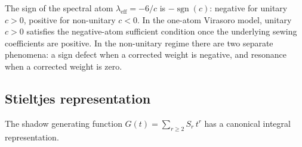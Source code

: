 \begin{remark}%
\label{rem:shadow-metric-gram}%
The sign of the spectral atom $\lambda_{\mathrm{eff}} = -6/c$
is $-\operatorname{sgn}(c)$: negative for unitary $c > 0$,
positive for non-unitary $c < 0$. In the one-atom Virasoro model,
unitary $c>0$ satisfies the negative-atom sufficient condition once the
underlying sewing coefficients are positive. In the non-unitary regime
there are two separate phenomena: a sign defect when a corrected weight
is negative, and resonance when a corrected weight is zero.
\end{remark}

\subsection{Stieltjes representation}
\label{sec:shadow-complex-structure}

The shadow generating function
$G(t) = \sum_{r\ge2} S_r\,t^r$
has a canonical integral representation.

